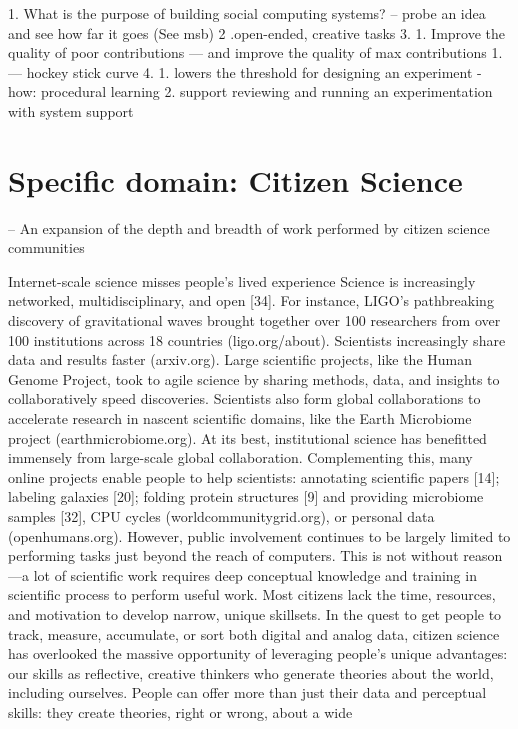 1. What is the purpose of building social computing systems?
-- probe an idea and see how far it goes (See msb)
2 .open-ended, creative tasks
3. 1. Improve the quality of poor contributions — and improve the quality of max contributions 
    1. — hockey stick curve 
4.
    1. lowers the threshold for designing an experiment - how: procedural learning
    2. support reviewing and running an experimentation with system support


\section{Specific domain: Citizen Science}
-- An expansion of the depth and breadth of work performed by citizen science communities

Internet-scale science misses people’s lived experience
Science is increasingly networked, multidisciplinary, and
open [34]. For instance, LIGO’s pathbreaking discovery of
gravitational waves brought together over 100 researchers
from over 100 institutions across 18 countries
(ligo.org/about). Scientists increasingly share data and results faster (arxiv.org). Large scientific projects, like the Human Genome Project, took to agile science by sharing
methods, data, and insights to collaboratively speed discoveries. Scientists also form global collaborations to accelerate
research in nascent scientific domains, like the Earth Microbiome project (earthmicrobiome.org).
At its best, institutional science has benefitted immensely
from large-scale global collaboration. Complementing this,
many online projects enable people to help scientists: annotating scientific papers [14]; labeling galaxies [20]; folding
protein structures [9] and providing microbiome samples
[32], CPU cycles (worldcommunitygrid.org), or personal data
(openhumans.org). However, public involvement continues
to be largely limited to performing tasks just beyond the
reach of computers. This is not without reason—a lot of scientific work requires deep conceptual knowledge and training in scientific process to perform useful work. Most
citizens lack the time, resources, and motivation to develop
narrow, unique skillsets.
In the quest to get people to track, measure, accumulate, or
sort both digital and analog data, citizen science has overlooked the massive opportunity of leveraging people’s
unique advantages: our skills as reflective, creative thinkers
who generate theories about the world, including ourselves.
People can offer more than just their data and perceptual
skills: they create theories, right or wrong, about a wide
